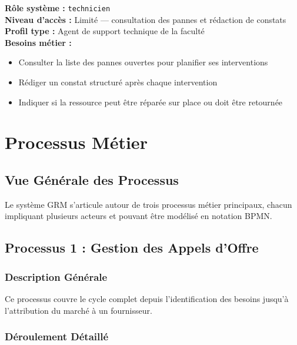 \documentclass[12pt,a4paper]{report}
\begin{document}
\begin{tcolorbox}[exigbox, title=Technicien de Maintenance]
\textbf{Rôle système :} \texttt{technicien} \\
\textbf{Niveau d'accès :} Limité — consultation des pannes et rédaction de constats \\
\textbf{Profil type :} Agent de support technique de la faculté \\[6pt]
\textbf{Besoins métier :}
\begin{itemize}
    \item Consulter la liste des pannes ouvertes pour planifier ses interventions
    \item Rédiger un constat structuré après chaque intervention
    \item Indiquer si la ressource peut être réparée sur place ou doit être retournée
\end{itemize}
\end{tcolorbox}

\chapter{Processus Métier}

\section{Vue Générale des Processus}

Le système GRM s'articule autour de trois processus métier principaux, chacun impliquant plusieurs acteurs et pouvant être modélisé en notation BPMN.

\section{Processus 1 : Gestion des Appels d'Offre}

\subsection{Description Générale}

Ce processus couvre le cycle complet depuis l'identification des besoins jusqu'à l'attribution du marché à un fournisseur.

\subsection{Déroulement Détaillé}
\end{document}
